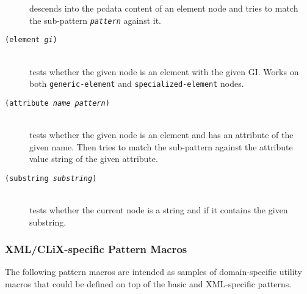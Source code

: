 \documentclass[a4paper,11pt]{scrartcl}
\begin{document}
\begin{description}
  descends into the pcdata content of an element node and tries to
  match the sub-pattern \texttt{\textsl{pattern}} against it.
\item[\texttt{(element \textsl{gi})}]\hspace{2cm}\\
  tests whether the given node is an element with the given GI.  Works
  on both \texttt{generic-element} and \texttt{specialized-element}
  nodes.
\item[\texttt{(attribute \textsl{name} \textsl{pattern})}]\hspace{2cm}\\
  tests whether the given node is an element and has an attribute of
  the given name.  Then tries to match the sub-pattern against the
  attribute value string of the given attribute.
\item[\texttt{(substring \textsl{substring})}]\hspace{2cm}\\
  tests whether the current node is a string and if it contains the
  given substring.
\end{description}


\subsubsection{XML/CLiX-specific Pattern Macros}

The following pattern macros are intended as samples of
domain-specific utility macros that could be defined on top of the
basic and XML-specific patterns.
\end{document}
